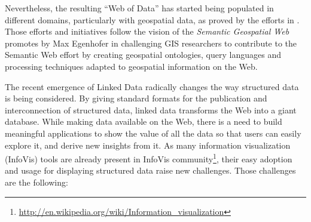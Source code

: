 Nevertheless, the resulting ``Web of Data'' has started being populated in different domains, particularly with geospatial data, as proved by the efforts in \cite{goodwin08,linkedgeodata,deLeon2010,Salas2011}. Those efforts and initiatives follow the vision of the \textit{Semantic Geospatial Web} promotes by Max Egenhofer in \cite{egenhofer12} challenging GIS researchers to contribute to the Semantic Web effort by creating geospatial ontologies, query languages and processing techniques adapted to geospatial information on the Web. 


The recent emergence of Linked Data radically changes the way structured data is being considered. By giving standard formats for the publication and interconnection of structured data, linked data transforms the Web into a giant database. While making data available on the Web, there is a need to build meaningful applications to show the value of all the data so that users can easily explore it, and derive new insights from it. As many information visualization (InfoVis) tools are already present in InfoVis community\footnote{\url{http://en.wikipedia.org/wiki/Information_visualization}}, their easy adoption and usage for displaying structured data raise new challenges. Those challenges are the following:
